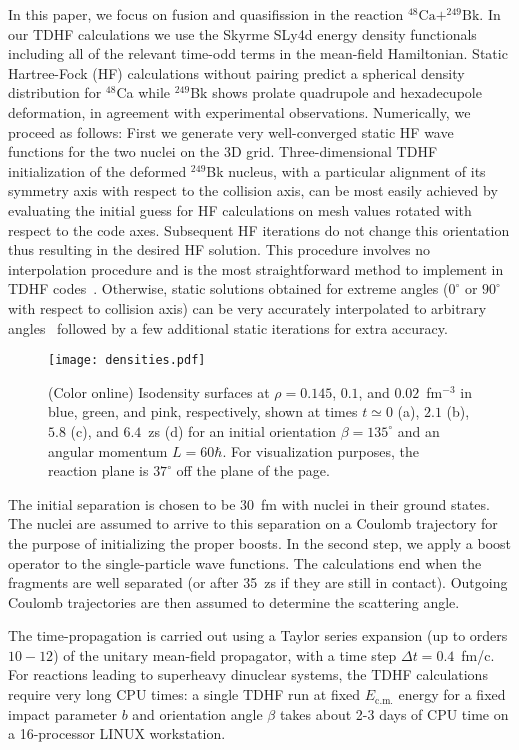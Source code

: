 \documentclass[reprint,aps,prc,twocolumn,floatfix,10pt]{revtex4-2}
\begin{document}
In this paper, we focus on fusion and quasifission in the reaction
$^{48}\mathrm{Ca}+^{249}\mathrm{Bk}$. In our TDHF calculations
we use the Skyrme SLy4d energy density functionals~\cite{kim1997}
including all of the relevant time-odd terms in the mean-field Hamiltonian.
Static Hartree-Fock (HF) calculations without pairing predict a spherical
density distribution for $^{48}$Ca while $^{249}$Bk shows prolate quadrupole
and hexadecupole deformation, in agreement with experimental observations.
Numerically, we proceed as follows: First we generate very well-converged static
HF wave functions for the two nuclei on the 3D grid.
Three-dimensional TDHF initialization of the deformed $^{249}$Bk nucleus, with a particular alignment of its symmetry
axis with respect to the collision axis, can be most easily achieved by
evaluating the initial guess for HF calculations
on mesh values rotated with respect to the code axes. Subsequent HF iterations do not change this
orientation thus resulting in the desired HF solution. This procedure involves no interpolation
procedure and is the most straightforward method to implement in TDHF codes~\cite{pigg2014}.
Otherwise, static solutions obtained for extreme angles ($0^{\circ}$ or $90^{\circ}$ with respect to collision
axis) can be very accurately interpolated to arbitrary angles~\cite{pigg2014} followed by a few additional static iterations for extra accuracy.
\begin{figure}[!thb]
\texttt{[image: densities.pdf]}
\caption{\protect(Color online) Isodensity surfaces at $\rho=0.145$, $0.1$, and $0.02$~fm$^{-3}$ in blue, green, and pink, respectively, shown at times $t\simeq0$ (a), $2.1$ (b), $5.8$ (c), and $6.4$~zs (d) for an initial orientation $\beta=135^{\circ}$ and an angular momentum $L=60\hbar$. For visualization purposes, the reaction plane  is $37^{\circ}$ off the plane of the page.}
\label{fig:density}
\end{figure}

The initial separation is chosen to be $30$~fm
with nuclei in their ground states. The nuclei are assumed to arrive
to this separation on a Coulomb trajectory for the purpose of initializing
the proper boosts.
In the second
step, we apply a boost operator to the single-particle wave functions.
The calculations end when the fragments are well separated (or after 35~zs if they are still in contact). Outgoing Coulomb trajectories are then assumed to determine the scattering angle.

The time-propagation
is carried out using a Taylor series expansion (up to orders $10-12$) of the
unitary mean-field propagator, with a time step $\Delta t = 0.4$~fm/c.
For reactions leading to superheavy dinuclear systems, the TDHF calculations
require very long CPU times: a single TDHF run at fixed $E_\mathrm{c.m.}$ energy
for a fixed impact parameter $b$ and orientation angle $\beta$ takes about 2-3 days of CPU time
on a 16-processor LINUX workstation.
\end{document}
